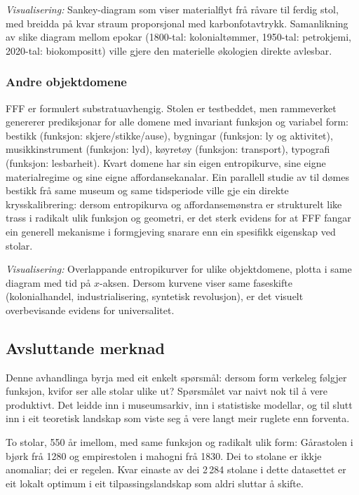 \documentclass[10pt, a4paper, twocolumn]{article}
\begin{document}
\textit{Visualisering:} Sankey-diagram som viser materialflyt frå råvare til ferdig stol, med breidda på kvar straum proporsjonal med karbonfotavtrykk. Samanlikning av slike diagram mellom epokar (1800-tal: kolonialtømmer, 1950-tal: petrokjemi, 2020-tal: biokompositt) ville gjere den materielle økologien direkte avlesbar.

\subsubsection{Andre objektdomene}

FFF er formulert substratuavhengig. Stolen er testbeddet, men rammeverket genererer prediksjonar for alle domene med invariant funksjon og variabel form: bestikk (funksjon: skjere/stikke/ause), bygningar (funksjon: ly og aktivitet), musikkinstrument (funksjon: lyd), køyretøy (funksjon: transport), typografi (funksjon: lesbarheit). Kvart domene har sin eigen entropikurve, sine eigne materialregime og sine eigne affordansekanalar. Ein parallell studie av til dømes bestikk frå same museum og same tidsperiode ville gje ein direkte krysskalibrering: dersom entropikurva og affordansemønstra er strukturelt like trass i radikalt ulik funksjon og geometri, er det sterk evidens for at FFF fangar ein generell mekanisme i formgjeving snarare enn ein spesifikk eigenskap ved stolar.

\textit{Visualisering:} Overlappande entropikurver for ulike objektdomene, plotta i same diagram med tid på $x$-aksen. Dersom kurvene viser same faseskifte (kolonialhandel, industrialisering, syntetisk revolusjon), er det visuelt overbevisande evidens for universalitet.

\subsection{Avsluttande merknad}

Denne avhandlinga byrja med eit enkelt spørsmål: dersom form verkeleg følgjer funksjon, kvifor ser alle stolar ulike ut? Spørsmålet var naivt nok til å vere produktivt. Det leidde inn i museumsarkiv, inn i statistiske modellar, og til slutt inn i eit teoretisk landskap som viste seg å vere langt meir ruglete enn forventa.

To stolar, 550 år imellom, med same funksjon og radikalt ulik form: Gårastolen i bjørk frå 1280 og empirestolen i mahogni frå 1830. Dei to stolane er ikkje anomaliar; dei er regelen. Kvar einaste av dei 2\,284 stolane i dette datasettet er eit lokalt optimum i eit tilpassingslandskap som aldri sluttar å skifte.
\end{document}
